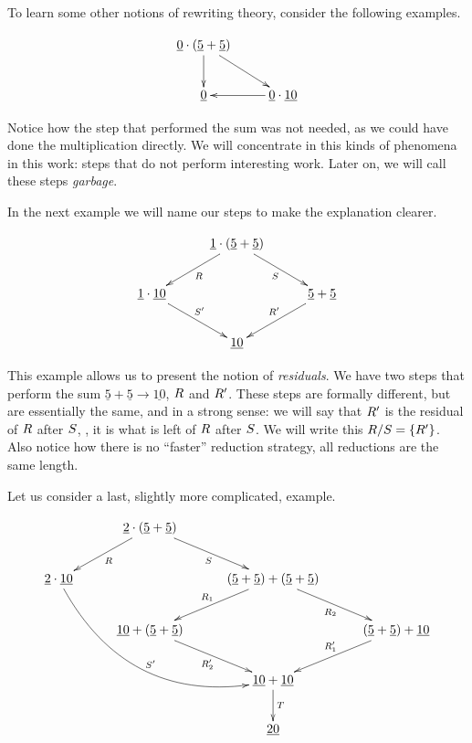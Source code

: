 To learn some other notions of rewriting theory, consider the following examples.

\[
\xymatrix{
  \underline{0} \cdot (\underline{5} + \underline{5}) \ar[d] \ar[dr] &                                           \\
  \underline{0}                                                      & \ar[l] \underline{0} \cdot \underline{10}
}
\]

Notice how the step that performed the sum was not needed, as we could have done the multiplication
directly. We will concentrate in this kinds of phenomena in this work: steps that do not perform interesting
work. Later on, we will call these steps \emph{garbage}.

In the next example we will name our steps to make the explanation clearer.

\[
\xymatrix@C=1cm{
  & \underline{1} \cdot (\underline{5} + \underline{5}) \ar[dl]^{\redex} \ar[dr]_{\redextwo}& \\
\underline{1} \cdot \underline{10} \ar[dr]^{\redextwo'} & & \underline{5} + \underline{5} \ar[dl]_{\redex'} \\
  & \underline{10} &
}
\]

This example allows us to present the notion of \emph{residuals}. We have two
steps that perform the sum $\underline{5} + \underline{5} \to \underline{10}$, $R$ and $R'$.
These steps are formally different, but are essentially the same, and in a strong sense:
we will say that $R'$ is the residual of $R$ after $S$, \ie, it is what is left of $R$
after $S$. We will write this $R / S = \{R'\}$.
Also notice how there is no ``faster'' reduction  strategy, all reductions are the same length.

Let us consider a last, slightly more complicated, example.

\[
\xymatrix@C=1cm{
  & \underline{2} \cdot (\underline{5} + \underline{5}) \ar[dl]^{\redex} \ar[dr]_{\redextwo} & & \\
\underline{2} \cdot \underline{10} \ar@/_3pc/[ddrr]^{\redextwo'} & & (\underline{5} + \underline{5}) + (\underline{5} + \underline{5}) \ar[dl]_{\redex_1} \ar[dr]_{\redex_2}& \\
  & \underline{10} + (\underline{5} + \underline{5}) \ar[dr]_{\redex_2'} & & (\underline{5} + \underline{5}) + \underline{10} \ar[dl]_{\redex_1'} \\
  & & \underline{10} + \underline{10} \ar[d]^{\redexthree}& \\
  & & \underline{20} &
}
\]

